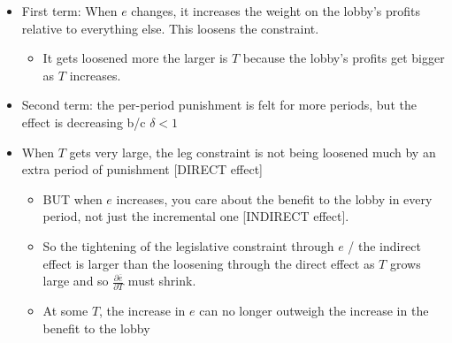 \documentclass[12pt]{article}
\newcommand{\ov}{\overline}
\begin{document}
\begin{itemize}
	\item First term: When $e$ changes, it increases the weight on the lobby's profits relative to everything else. This loosens the constraint.
		\begin{itemize}
			\item It gets loosened more the larger is $T$ because the lobby's profits get bigger as $T$ increases.
		\end{itemize}
	\item Second term: the per-period punishment is felt for more periods, but the effect is decreasing b/c $\delta < 1$
	\item When $T$ gets very large, the leg constraint is not being loosened much by an extra period of punishment [DIRECT effect]
		\begin{itemize}
			\item BUT when $e$ increases, you care about the benefit to the lobby in every period, not just the incremental one [INDIRECT effect].
			\item So the tightening of the legislative constraint through $e$ / the indirect effect is larger than the loosening through the direct effect as $T$ grows large and so $\frac{\partial \ov{e}}{\partial T}$ must shrink.
			\item At some $T$, the increase in $e$ can no longer outweigh the increase in the benefit to the lobby
		\end{itemize}
\end{itemize}
\end{document}

